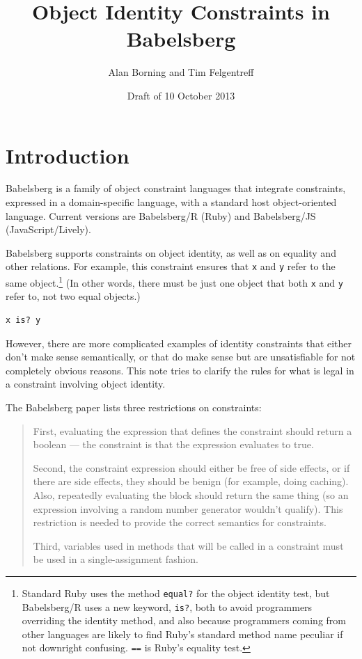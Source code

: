 \documentclass{article}
\begin{document}
\sloppy

\title{Object Identity Constraints in Babelsberg}
\author{Alan Borning and Tim Felgentreff}
\date{Draft of 10 October 2013}

\maketitle

\section{Introduction}

Babelsberg \cite{felgentreff-babelsberg-tr} is a family of object
constraint languages that integrate constraints, expressed in a
domain-specific language, with a standard host object-oriented
language.  Current versions are Babelsberg/R (Ruby) and Babelsberg/JS
(JavaScript/Lively).

Babelsberg supports constraints on object identity, as well as on
equality and other relations.  For example, this constraint ensures
that \verb|x| and \verb|y| refer to the same object.\footnote{Standard
  Ruby uses the method {\tt equal?} for the object identity test, but
  Babelsberg/R uses a new keyword, {\tt is?}, both to avoid
  programmers overriding the identity method, and also because
  programmers coming from other languages are likely to find Ruby's
  standard method name peculiar if not downright confusing.  {\tt ==}
  is Ruby's equality test.}  (In other words, there must be just one
object that both \verb|x| and \verb|y| refer to, not two equal
objects.)

\begin{verbatim}
x is? y
\end{verbatim}


However, there are more complicated examples of identity constraints
that either don't make sense semantically, or that do make sense but
are unsatisfiable for not completely obvious reasons.  This note tries
to clarify the rules for what is legal in a constraint involving
object identity.  

The Babelsberg paper \cite{felgentreff-babelsberg-tr} lists three
restrictions on constraints:

\begin{quotation}
First, evaluating the expression that defines the constraint should return a
boolean --- the constraint is that the expression evaluates to true.

Second, the constraint expression should either be free of side
effects, or if there are side effects, they should be benign (for
example, doing caching).  Also, repeatedly evaluating the block should
return the same thing (so an expression involving a random number
generator wouldn't qualify).  This restriction is needed to provide
the correct semantics for constraints.

Third, variables used in methods that will be called in a constraint
must be used in a single-assignment fashion.  
\end{quotation}
\end{document}
